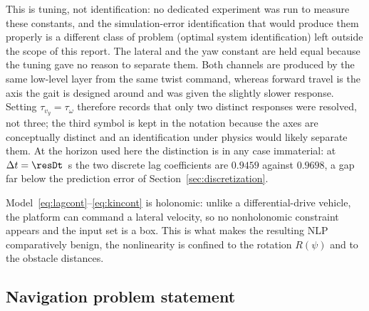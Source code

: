 \documentclass[11pt,a4paper]{article}
\begin{document}
This is tuning, not identification: no dedicated experiment was run to measure these constants, and the
simulation-error identification that would produce them properly is a different class of problem (optimal
system identification) left outside the scope of this report. The lateral and the yaw constant are held
equal because the tuning gave no reason to separate them. Both channels are produced by the same low-level
layer from the same twist command, whereas forward travel is the axis the gait is designed around and was
given the slightly slower response. Setting $\tau_{v_y}=\tau_\omega$ therefore records that only two
distinct responses were resolved, not three; the third symbol is kept in the notation because the axes are
conceptually distinct and an identification under physics would likely separate them. At the horizon used
here the distinction is in any case immaterial: at $\Delta t=\resDt$~s the two discrete lag coefficients are
$0.9459$ against $0.9698$, a gap far below the prediction error of Section~\ref{sec:discretization}.

Model~\eqref{eq:lagcont}--\eqref{eq:kincont} is holonomic: unlike a differential-drive vehicle, the platform
can command a lateral velocity, so no nonholonomic constraint appears and the input set is a box. This is what
makes the resulting NLP comparatively benign, the nonlinearity is confined to the rotation
$R(\psi)$ and to the obstacle distances.



\subsection{Navigation problem statement}
\label{sec:statement}
\end{document}
